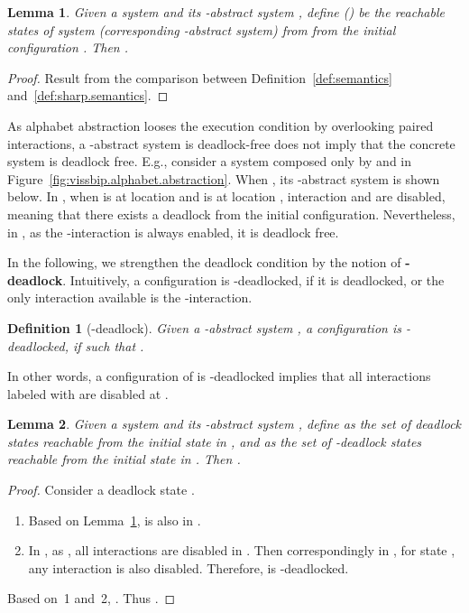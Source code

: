 \documentclass[10pt, a4paper, onecolumn, conference, compsocconf]{IEEEtran}
\newtheorem{defi}{Definition}
\newtheorem{lemma}{Lemma}
\begin{document}
\begin{lemma}\label{lem:simulation}
Given a system  and its -abstract system ,
define  () be the reachable states of system  (corresponding -abstract system)
from from the initial configuration . Then .
\end{lemma}

\begin{proof}
Result from the comparison between Definition~\ref{def:semantics} and~\ref{def:sharp.semantics}.
\end{proof}

As alphabet abstraction looses the execution condition by overlooking paired interactions,
a -abstract system is deadlock-free does not imply that the concrete system is deadlock free.
E.g., consider a system  composed only by  and  in Figure~\ref{fig:vissbip.alphabet.abstraction}.
When , its -abstract system  is shown below.
In , when  is at location  and  is at location , interaction  and  are disabled, meaning that there exists a deadlock from the initial configuration. Nevertheless, in , as the -interaction is always enabled, it is deadlock free.

In the following, we strengthen the deadlock condition by the notion of \textbf{-deadlock}. Intuitively,
a configuration is -deadlocked, if it is deadlocked, or the only interaction available is the -interaction.

\begin{defi}[-deadlock]\label{def:sharplock}
Given a -abstract system , a configuration  is -deadlocked, if
  such that .
\end{defi}
In other words, a configuration  of  is -deadlocked implies that all interactions labeled with  are disabled at .


\begin{lemma}\label{lem:deadlock}
Given a system  and its -abstract system , define  as the set of deadlock states reachable from the initial state in , and  as the set of -deadlock states reachable from the initial state in .
Then .
\end{lemma}

\begin{proof}
Consider a deadlock state .
\begin{enumerate}
    \item Based on Lemma~\ref{lem:simulation},  is also in .
    \item In , as , all interactions are disabled in . Then correspondingly in , for state , any interaction  is also disabled. Therefore,  is -deadlocked.
\end{enumerate}
Based on~1 and~2, . Thus .
\end{proof}
\end{document}
